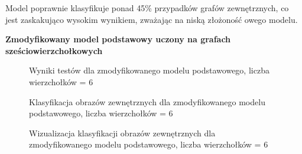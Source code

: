Model poprawnie klasyfikuje ponad 45\% przypadków grafów zewnętrznych, co jest zaskakująco wysokim wynikiem,
zważając na niską złożoność owego modelu.




\textbf{Zmodyfikowany model podstawowy uczony na grafach sześciowierzchołkowych}




\begin{figure}[ht]
	\centering
	\caption{Wyniki testów dla zmodyfikowanego modelu podstawowego, liczba wierzchołków = 6}
	\label{Fig:tests-base-3a}
\end{figure}
\FloatBarrier


\begin{figure}[ht]
	\centering
	\caption{Klasyfikacja obrazów zewnętrznych dla zmodyfikowanego modelu podstawowego, liczba wierzchołków = 6}
	\label{Fig:tests-base-3b}
\end{figure}
\FloatBarrier

\begin{figure}[ht]
	\centering
	\caption{Wizualizacja klasyfikacji obrazów zewnętrznych dla zmodyfikowanego modelu podstawowego, liczba wierzchołków = 6}
	\label{Fig:tests-base-3c}
\end{figure}
\FloatBarrier

